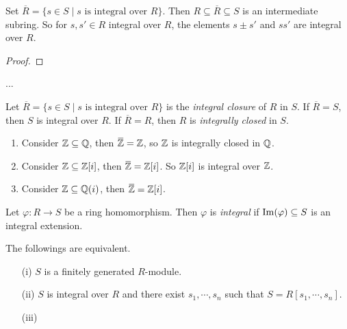 \begin{theorem}
    Set $\overbar{R} = \{s \in S \mid s \text{ is integral over }R\}$. Then $R \subseteq \overbar{R} \subseteq S$ is an intermediate subring. So for $s,s' \in R$ integral over $R$, the elements $s \pm s'$ and $ss'$ are integral over $R$.
\end{theorem}

\begin{proof}
\end{proof}

\begin{note*}
    ...
\end{note*}

\begin{definition}
    Let $\overbar{R} = \{s \in S \mid s \text{ is integral over }R\}$ is the \emph{integral closure} of $R$ in $S$. If $\overbar{R} = S$, then $S$ is integral over $R$. If $\overbar{R} = R$, then $R$ is \emph{integrally closed} in $S$.
\end{definition}

\begin{example}
    \begin{enumerate}
        \item Consider $\mathbb{Z} \subseteq \mathbb{Q}$, then $\overbar{\bbZ} = \bbZ$, so $\mathbb{Z}$ is integrally closed in $\mathbb{Q}$.
        \item Consider $\mathbb{Z} \subseteq \mathbb{Z}[i]$, then $\overbar{\bbZ} = \bbZ[i]$. So $\mathbb{Z}[i]$ is integral over $\mathbb{Z}$.
        \item Consider $\mathbb{Z} \subseteq \mathbb{Q}(i)$, then $\overbar{\bbZ} = \bbZ[i]$.
    \end{enumerate}
\end{example}

\begin{definition}
    Let $\varphi: R \to S$ be a ring homomorphism. Then $\varphi$ is \emph{integral} if $\operatorname{Im}(\varphi) \subseteq S$ is an integral extension.
\end{definition}

\begin{theorem}
    The followings are equivalent.
    \begin{enumerate}
        \item[(i)]
            $S$ is a finitely generated $R$-module.
        \item[(ii)]
            $S$ is integral over $R$ and there exist $s_1,\cdots,s_n$ such that $S = R[s_1,\cdots,s_n]$.
        \item[(iii)]
    \end{enumerate}
\end{theorem}


